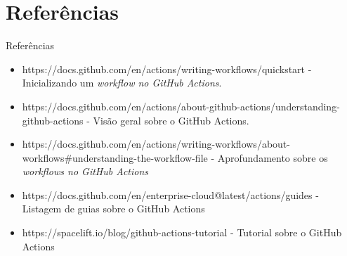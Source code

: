 \documentclass[t,serif]{beamer}
\begin{document}
\section{Referências}
	\begin{frame}{Referências}
		\begin{itemize}
			\item https://docs.github.com/en/actions/writing-workflows/quickstart - Inicializando um \textit{workflow no GitHub Actions}.
			\item https://docs.github.com/en/actions/about-github-actions/understanding-github-actions - Visão geral sobre o GitHub Actions.
			\item https://docs.github.com/en/actions/writing-workflows/about-workflows\#understanding-the-workflow-file - Aprofundamento sobre os \textit{workflows no GitHub Actions}
			\item https://docs.github.com/en/enterprise-cloud@latest/actions/guides - Listagem de guias sobre o GitHub Actions
			\item https://spacelift.io/blog/github-actions-tutorial - Tutorial sobre o GitHub Actions
		\end{itemize}
	\end{frame}
\end{document}
